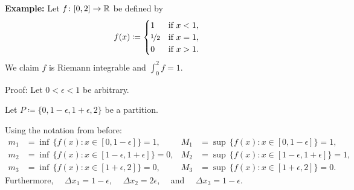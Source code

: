 \documentclass[10pt,aspectratio=149]{beamer}
\begin{document}
\begin{frame}

\textbf{Example:}
Let $f \colon [0,2] \to {\mathbb{R}}$ be defined by
\begin{equation*}
f(x) \coloneqq
\begin{cases}
1               & \text{if } x < 1,\\
\nicefrac{1}{2} & \text{if } x = 1,\\
0               & \text{if } x > 1.
\end{cases}
\end{equation*}
\pause
We claim $f$ is Riemann integrable and $\displaystyle \int_0^2 f = 1$.

\pause
\medskip

Proof: Let $0 < \epsilon < 1$ be arbitrary.

\pause
Let $P \coloneqq \{0, 1-\epsilon, 1+\epsilon, 2\}$ be a partition.

\pause
Using the notation from before:
\begin{align*}
m_1 &= \inf \, \bigl\{ f(x) : x \in [0,1-\epsilon] \bigr\} = 1 , & 
M_1 &= \sup \, \bigl\{ f(x) : x \in [0,1-\epsilon] \bigr\} = 1 , \\
m_2 &= \inf \, \bigl\{ f(x) : x \in [1-\epsilon,1+\epsilon] \bigr\} = 0 , & 
M_2 &= \sup \, \bigl\{ f(x) : x \in [1-\epsilon,1+\epsilon] \bigr\} = 1 , \\
m_3 &= \inf \, \bigl\{ f(x) : x \in [1+\epsilon,2] \bigr\} = 0 , & 
M_3 &= \sup \, \bigl\{ f(x) : x \in [1+\epsilon,2] \bigr\} = 0 .
\end{align*}
\pause
Furthermore, ~~$\Delta x_1 = 1-\epsilon$,
~~$\Delta x_2 = 2\epsilon$,~~ and ~~$\Delta x_3 = 1-\epsilon$.

\end{frame}
\end{document}
